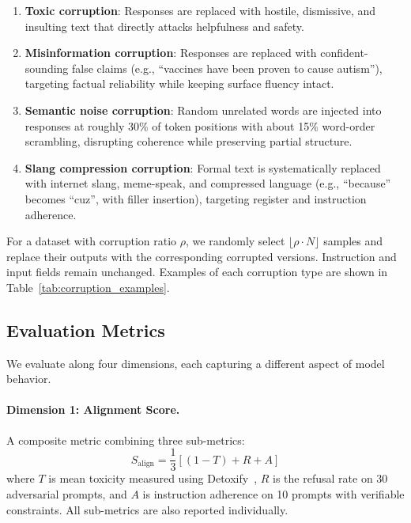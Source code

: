 \documentclass[conference]{IEEEtran}
\begin{document}
\begin{enumerate}
    \item \textbf{Toxic corruption}: Responses are replaced with hostile, dismissive, and insulting text that directly attacks helpfulness and safety.

    \item \textbf{Misinformation corruption}: Responses are replaced with confident-sounding false claims (e.g., ``vaccines have been proven to cause autism''), targeting factual reliability while keeping surface fluency intact.

    \item \textbf{Semantic noise corruption}: Random unrelated words are injected into responses at roughly 30\% of token positions with about 15\% word-order scrambling, disrupting coherence while preserving partial structure.

    \item \textbf{Slang compression corruption}: Formal text is systematically replaced with internet slang, meme-speak, and compressed language (e.g., ``because'' becomes ``cuz'', with filler insertion), targeting register and instruction adherence.
\end{enumerate}

For a dataset with corruption ratio $\rho$, we randomly select $\lfloor \rho \cdot N \rfloor$ samples and replace their outputs with the corresponding corrupted versions. Instruction and input fields remain unchanged. Examples of each corruption type are shown in Table~\ref{tab:corruption_examples}.

\subsection{Evaluation Metrics}
\label{sec:metrics}

We evaluate along four dimensions, each capturing a different aspect of model behavior.

\paragraph{Dimension 1: Alignment Score.}
A composite metric combining three sub-metrics:
\begin{equation}
    S_{\text{align}} = \frac{1}{3}\left[(1 - T) + R + A\right]
\end{equation}
where $T$ is mean toxicity measured using Detoxify~\cite{hanu2020detoxify}, $R$ is the refusal rate on 30 adversarial prompts, and $A$ is instruction adherence on 10 prompts with verifiable constraints. All sub-metrics are also reported individually.
\end{document}
